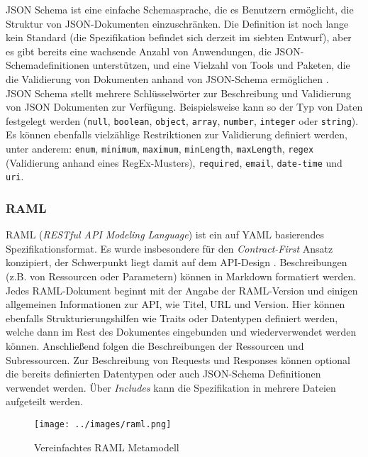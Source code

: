 JSON Schema ist eine einfache Schemasprache, die es Benutzern ermöglicht, die Struktur von JSON-Dokumenten einzuschränken. Die Definition ist noch lange kein Standard (die Spezifikation befindet sich derzeit im siebten Entwurf), aber es gibt bereits eine wachsende Anzahl von Anwendungen, die JSON-Schemadefinitionen unterstützen, und eine Vielzahl von Tools und Paketen, die die Validierung von Dokumenten anhand von JSON-Schema ermöglichen \parencite[264]{pezoa2016foundations}. \\

JSON Schema stellt mehrere Schlüsselwörter zur Beschreibung und Validierung von JSON Dokumenten zur Verfügung. Beispielsweise kann so der Typ von Daten festgelegt werden (\lstinline|null|, \lstinline|boolean|, \lstinline|object|, \lstinline|array|, \lstinline|number|, \lstinline|integer| oder \lstinline|string|). Es können ebenfalls vielzählige Restriktionen zur Validierung definiert werden, unter anderem: \lstinline|enum|, \lstinline|minimum|, \lstinline|maximum|, \lstinline|minLength|, \lstinline|maxLength|, \lstinline|regex| (Validierung anhand eines RegEx-Musters), \lstinline|required|, \lstinline|email|, \lstinline|date-time| und \lstinline|uri|.

\subsubsection{RAML}
RAML (\emph{RESTful API Modeling Language}) ist ein auf YAML basierendes Spezifikationsformat. Es wurde insbesondere für den \emph{Contract-First} Ansatz konzipiert, der Schwerpunkt liegt damit auf dem API-Design \parencites[277]{spichale2017api}[165]{tilkov2015rest}. Beschreibungen (z.B. von Ressourcen oder Parametern) können in Markdown formatiert werden. \\

Jedes RAML-Dokument beginnt mit der Angabe der RAML-Version und einigen allgemeinen Informationen zur API, wie Titel, URL und Version. Hier können ebenfalls Strukturierungshilfen wie Traits oder Datentypen definiert werden, welche dann im Rest des Dokumentes eingebunden und wiederverwendet werden können. Anschließend folgen die Beschreibungen der Ressourcen und Subressourcen. Zur Beschreibung von Requests und Responses können optional die bereits definierten Datentypen oder auch JSON-Schema Definitionen verwendet werden. Über \emph{Includes} kann die Spezifikation in mehrere Dateien aufgeteilt werden.

\begin{figure}[H]
  \texttt{[image: ../images/raml.png]}
  \caption{Vereinfachtes RAML Metamodell}
  \label{fig:raml}
\end{figure}

